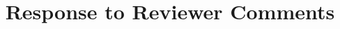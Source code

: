 \documentclass[10pt,letterpaper,onecolumn]{ieeetran}
\begin{document}
\doublespacing

\title{Response to Reviewer Comments}


\end{document}
